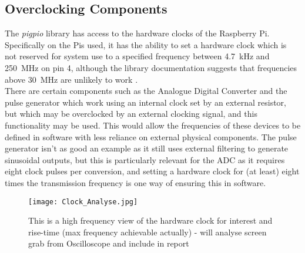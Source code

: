 \documentclass[../main.tex]{subfiles}
\begin{document}
\subsection{Overclocking Components}

The \textit{pigpio} library has access to the hardware clocks of the Raspberry Pi.
Specifically on the Pis used, it has the ability to set a hardware clock which is not reserved for system use to a specified frequency between \SI{4.7}{\kilo\hertz} and \SI{250}{\mega\hertz} on pin 4, although the library documentation suggests that frequencies above \SI{30}{\mega\hertz} are unlikely to work \cite{lib_pigpioHWClock}.\\

There are certain components such as the Analogue Digital Converter and the pulse generator which work using an internal clock set by an external resistor, but which may be overclocked by an external clocking signal, and this functionality may be used.
This would allow the frequencies of these devices to be defined in software with less reliance on external physical components.
The pulse generator isn't as good an example as it still uses external filtering to generate sinusoidal outputs, but this is particularly relevant for the ADC as it requires eight clock pulses per conversion, and setting a hardware clock for (at least) eight times the transmission frequency is one way of ensuring this in software.\\

\begin{figure}[ht]
	\centering
	\texttt{[image: Clock\_Analyse.jpg]}
	\caption{This is a high frequency view of the hardware clock for interest and rise-time (max frequency achievable actually) - will analyse screen grab from Oscilloscope and include in report}
\end{figure}
\end{document}
